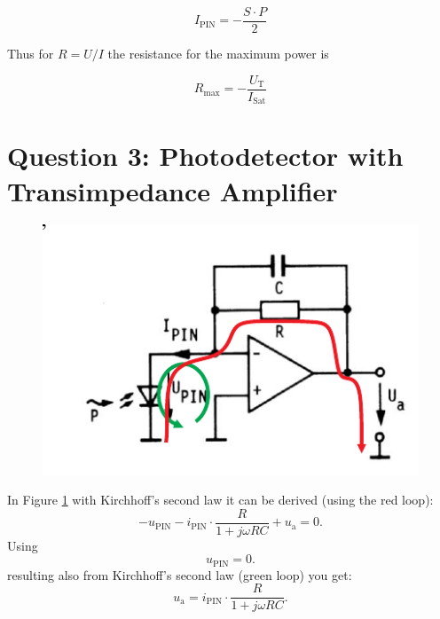 \begin{equation}
I_{\mathrm{PIN}} = - \frac{S \cdot P}{2}
\label{eq:}
\end{equation}

Thus for $R = U/I$ the resistance for the maximum power is

\begin{equation}
R_{\mathrm{max}} = - \frac{U_{\mathrm{T}}}{I_{\mathrm{Sat}}}
\label{eq:}
\end{equation}


\section{Question 3: Photodetector with Transimpedance Amplifier}

\begin{figure}[h]%
\centering
\includegraphics[width=.8\columnwidth]{Grafiken/OPAMP_m.pdf}
\caption{}%
\label{fig:OPAMP}%

\end{figure}

In Figure \ref{fig:OPAMP} with Kirchhoff's second law it can be derived (using the red loop):
\begin{equation}
 - u_{\mathrm{PIN}} - i_{\mathrm{PIN}}\cdot \frac{R}{1+ j\omega RC}+u_{\mathrm{a}} = 0 .
\label{eq:masche1}
\end{equation}
Using
\begin{equation}
 u_{\mathrm{PIN}}=0.
\label{eq:masche2}
\end{equation}
resulting also from Kirchhoff's second law (green loop) you get:
\begin{equation}
 u_{\mathrm{a}} = i_{\mathrm{PIN}}\cdot \frac{R}{1+ j\omega RC}.
\label{eq:ua}
\end{equation}

